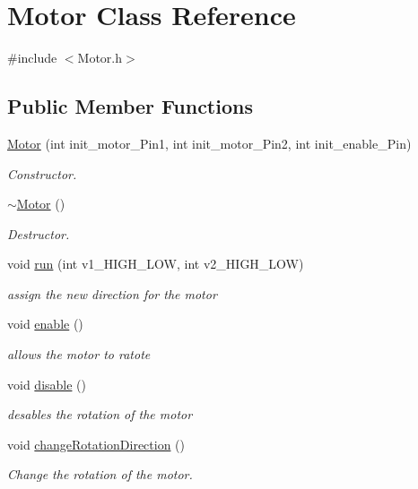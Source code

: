 \hypertarget{class_motor}{}\section{Motor Class Reference}
\label{class_motor}


{\ttfamily \#include $<$Motor.\+h$>$}

\subsection*{Public Member Functions}
\begin{DoxyCompactItemize}
\item 
\hyperlink{class_motor_af153121a5e217901c8e3d47727b4e2d2}{Motor} (int init\+\_\+motor\+\_\+\+Pin1, int init\+\_\+motor\+\_\+\+Pin2, int init\+\_\+enable\+\_\+\+Pin)
\begin{DoxyCompactList}\small\item\em Constructor. \end{DoxyCompactList}\item 
\hyperlink{class_motor_a2e57c7b2681efea1d3b7f253ee88ecd4}{$\sim$\+Motor} ()
\begin{DoxyCompactList}\small\item\em Destructor. \end{DoxyCompactList}\item 
void \hyperlink{class_motor_a7ee681f77332ff9fd64365f90a12da50}{run} (int v1\+\_\+\+H\+I\+G\+H\+\_\+\+L\+OW, int v2\+\_\+\+H\+I\+G\+H\+\_\+\+L\+OW)
\begin{DoxyCompactList}\small\item\em assign the new direction for the motor \end{DoxyCompactList}\item 
void \hyperlink{class_motor_acdf6ea64d3bc32cec89103ea23521303}{enable} ()
\begin{DoxyCompactList}\small\item\em allows the motor to ratote \end{DoxyCompactList}\item 
void \hyperlink{class_motor_adf84e8f39fb82027b3343f5fb1cdbf96}{disable} ()
\begin{DoxyCompactList}\small\item\em desables the rotation of the motor \end{DoxyCompactList}\item 
void \hyperlink{class_motor_aab4e351cba813805bdcff0072e818510}{change\+Rotation\+Direction} ()
\begin{DoxyCompactList}\small\item\em Change the rotation of the motor. \end{DoxyCompactList}\item 

\end{DoxyCompactItemize}
